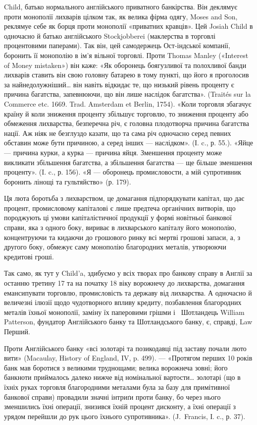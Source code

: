 \parcont{}  %
Child, батько нормального англійського приватного банкірства. Він деклямує
проти монополії лихварів цілком так, як велика фірма одягу, Moses and Son,
реклямуе себе як борця проти монополії «приватних кравців». Цей Josiah Child
в одночасно й батько англійського Stockjobberei (маклерства в торговлі процентовими
паперами). Так він, цей самодержець Ост-індської компанії, боронить її
монополію в ім’я вільної торговлі. Проти Thomas Manley («Interest of Money
mistaken») він каже: «Як оборонець боягузливої та полохливої банди лихварів
ставить він свою головну батарею в тому пункті, що його я проголосив за
найнедолужніший\dots{} він навіть відкидає те, що низький рівень проценту є причина
багатства, запевнюючи, що він лише наслідок багатства». (Traités sur la
Commerce etc. 1669. Trad. Amsterdam et Berlin, 1754). «Коли торговля збагачує
країну й коли зниження проценту збільшує торговлю, то зниження проценту
або обмеження лихварства, безперечна річ, є головна плодотворча причина багатства
нації. Аж ніяк не безглуздо казати, що та сама річ одночасно серед певних
обставин може бути причиною, а серед інших — наслідком». (І. c., р. 55.). «Яйце —
причина курки, а курка — причина яйця. Зменшення проценту може викликати
збільшення багатства, а збільшення багатства — ще більше зменшення проценту».
(I. c., р. 156). «Я — оборонець промисловости, а мій супротивник боронить
лінощі та гультяйство» (р. 179).

Ця люта боротьба з лихварством, це домагання підпорядкувати капітал, що
дає процент, промисловому капіталові є лише предтеча органічних витворів, що
породжують ці умови капіталістичної продукції у формі новітньої банкової справи,
яка з одного боку, вириває в лихварського капіталу його монополію, концентруючи
та кидаючи до грошового ринку всі мертві грошові запаси, а, з другого
боку, обмежує саму монополію благородних металів, утворюючи кредитові гроші.

Так само, як тут у Child’a, здибуємо у всіх творах про банкову справу
в Англії за останню третину 17 та на початку 18 віку ворожнечу до лихварства,
домагання емансипувати торговлю, промисловість та державу від лихварства.
А одночасно й величезні ілюзії щодо чудотворного впливу кредиту, позбавлення
благородних металів їхньої монополії, заміну їх паперовими грішми
і~ Шотландець William Patterson, фундатор Англійського банку та Шотландського
банку, є, справді, Law Перший.

Проти Англійського банку «всі золотарі та позикодавці під заставу почали
люто вити» (Macaulay, History of England, IV, p. 499). — «Протягом перших
10 років банк мав боротися з великими труднощами; велика ворожнеча
зовні; його банкноти приймалось далеко нижче від номінальної вартости\dots{} золотарі
(що в їхніх руках торговля благородними металами була за базу для
примітивної банкової справи) провадили значні інтриґи проти банку, бо через
нього зменшились їхні операції, знизився їхній процент дисконту, а їхні
операції з урядом перейшли до рук цього їхнього супротивника». (J.~Francis,
І. c., р. 37).

